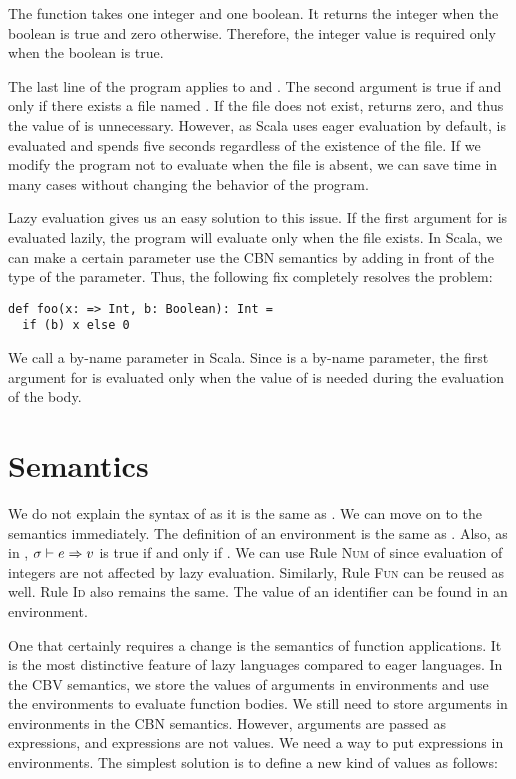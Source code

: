 The function  takes one integer and one boolean. It
returns the integer when the boolean is true and zero otherwise. Therefore, the
integer value is required only when the boolean is true.

The last line of the program applies  to  and
. The second argument is true if and only
if there exists a file named . If the file does not exist, 
returns zero, and thus the value of  is unnecessary.
However, as Scala uses eager evaluation by default,  is
evaluated and spends five seconds regardless of the existence of the file.
If we modify the program not to evaluate  when the file is
absent, we can save time in many cases without changing the behavior of the
program.

Lazy evaluation gives us an easy solution to this issue. If the first argument
for  is evaluated lazily, the program will evaluate
 only when the file exists. In Scala, we can make a certain
parameter use the CBN semantics by adding \code{=>} in front of the type of the
parameter. Thus, the following fix completely resolves the problem:

\begin{verbatim}
def foo(x: => Int, b: Boolean): Int =
  if (b) x else 0
\end{verbatim}

We call  a by-name parameter in Scala. Since  is a by-name
parameter, the first argument for  is evaluated only when the value of
 is needed during the evaluation of the body.

\section{Semantics}

We do not explain the syntax of \lang as it is the same as \plang.
We can move on to the semantics immediately. The definition of an environment is
the same as \plang. Also, as in \plang, $\sigma\vdash e\Rightarrow v$ is true if and only if
. We can use Rule \textsc{Num} of \lang since evaluation of
integers are not affected by lazy evaluation. Similarly, Rule \textsc{Fun} can
be reused as well. Rule \textsc{Id} also remains the same.
The value of an identifier can be found in an environment.

One that certainly requires a change is the semantics of function applications.
It is the most distinctive feature of lazy languages compared to eager
languages. In the CBV semantics, we store the values of arguments in
environments and use the environments to evaluate function bodies. We still need
to store arguments in environments in the CBN semantics. However, arguments are
passed as expressions, and expressions are not values. We need a way to put
expressions in environments. The simplest solution is to define a new kind of
values as follows:

